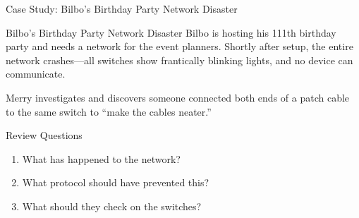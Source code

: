 \documentclass[aspectratio=169]{beamer}  %
\begin{document}
\begin{frame}{Case Study: Bilbo's Birthday Party Network Disaster}
    \begin{casestudy}{Bilbo's Birthday Party Network Disaster}
        Bilbo is hosting his 111th birthday party and needs a network for the event planners. Shortly after setup, the entire network crashes---all switches show frantically blinking lights, and no device can communicate.
        
        \vspace{0.5em}
        Merry investigates and discovers someone connected both ends of a patch cable to the same switch to ``make the cables neater.''
    \end{casestudy}
    
    \begin{block}{Review Questions}
        \begin{enumerate}
            \item What has happened to the network?
            \item What protocol should have prevented this?
            \item What should they check on the switches?
        \end{enumerate}
    \end{block}
\end{frame}
\end{document}
